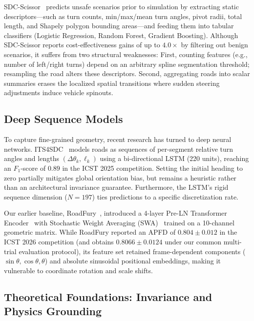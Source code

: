 SDC-Scissor~\cite{sdcscissor,saner} predicts unsafe scenarios prior to simulation by extracting static descriptors---such as turn counts, min/max/mean turn angles, pivot radii, total length, and Shapely polygon bounding areas---and feeding them into tabular classifiers (Logistic Regression, Random Forest, Gradient Boosting).
Although SDC-Scissor reports cost-effectiveness gains of up to $4.0\times$ by filtering out benign scenarios, it suffers from two structural weaknesses:
First, counting features (e.g., number of left/right turns) depend on an arbitrary spline segmentation threshold; resampling the road alters these descriptors.
Second, aggregating roads into scalar summaries erases the localized spatial transitions where sudden steering adjustments induce vehicle spinouts.

\subsection{Deep Sequence Models}

To capture fine-grained geometry, recent research has turned to deep neural networks.
ITS4SDC~\cite{its4sdc} models roads as sequences of per-segment relative turn angles and lengths $(\Delta\theta_k, \ell_k)$ using a bi-directional LSTM (220 units), reaching an $F_1$-score of $0.89$ in the ICST 2025 competition.
Setting the initial heading to zero partially mitigates global orientation bias, but remains a heuristic rather than an architectural invariance guarantee.
Furthermore, the LSTM's rigid sequence dimension ($N=197$) ties predictions to a specific discretization rate.

Our earlier baseline, RoadFury~\cite{roadfury}, introduced a 4-layer Pre-LN Transformer Encoder~\cite{transformer,preln} with Stochastic Weight Averaging (SWA)~\cite{swa} trained on a 10-channel geometric matrix.
While RoadFury reported an APFD of $0.804 \pm 0.012$ in the ICST 2026 competition (and obtains $0.8066 \pm 0.0124$ under our common multi-trial evaluation protocol), its feature set retained frame-dependent components ($\sin\theta, \cos\theta, \theta$) and absolute sinusoidal positional embeddings, making it vulnerable to coordinate rotation and scale shifts.

\subsection{Theoretical Foundations: Invariance and Physics Grounding}

